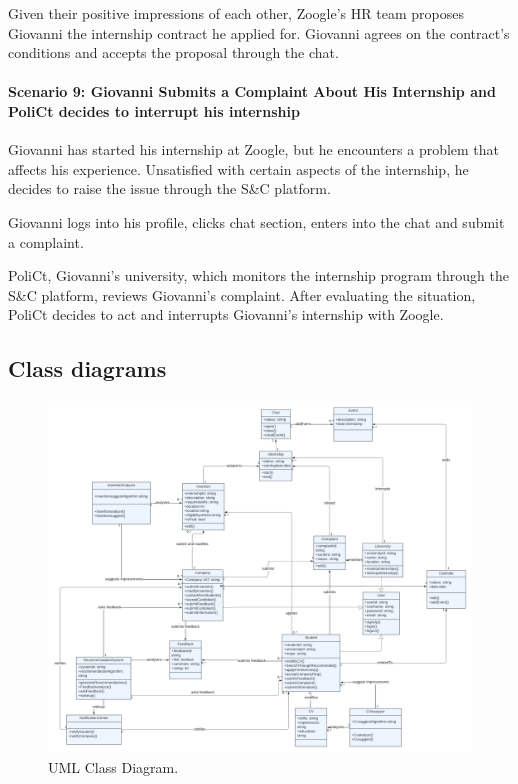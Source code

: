 Given their positive impressions of each other, Zoogle's HR team
proposes Giovanni the internship contract he applied for. Giovanni
agrees on the contract's conditions and accepts the proposal through the
chat.


\paragraph{Scenario 9: Giovanni Submits a Complaint About His Internship
and PoliCt decides to interrupt his internship}

Giovanni has started his internship at Zoogle, but he encounters a
problem that affects his experience. Unsatisfied with certain aspects of
the internship, he decides to raise the issue through the S\&C platform.

Giovanni logs into his profile, clicks chat section, enters into the
chat and submit a complaint.

PoliCt, Giovanni's university, which monitors the internship program
through the S\&C platform, reviews Giovanni's complaint.
After evaluating the situation, PoliCt decides to act and
interrupts Giovanni's internship with Zoogle.


\subsection{Class diagrams}
\label{subsec:class_diagrams}%


\begin{figure}[H]
    \begin{center}
        \includegraphics[width=\linewidth]{Images/ClassDiagram/UMLClass.png}
        \caption{UML Class Diagram.}
        \label{fig:UML_class_diag}%
    \end{center}
\end{figure}


